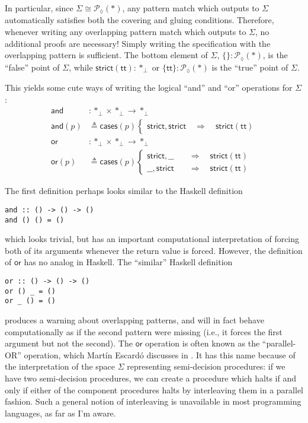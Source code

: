 \documentclass[conference]{IEEEtran}
\newcommand{\PLower}{\mathcal{P}_\lozenge}
\newcommand{\One}{\ast}
\newcommand{\Branch}{\Rightarrow}
\begin{document}
In particular, since $\Sigma \cong \PLower(\One)$, any pattern match which outputs to $\Sigma$ automatically satisfies both the covering and gluing conditions. Therefore, whenever writing any overlapping pattern match which outputs to $\Sigma$, no additional proofs are necessary! Simply writing the specification with the overlapping pattern is sufficient. The bottom element of $\Sigma$, $\{ \} : \PLower(\One)$, is the ``false'' point of $\Sigma$, while $\mathsf{strict}(\mathsf{tt}) : \One_\bot$ or $\{ \mathsf{tt} \} : \PLower(\One)$ is the ``true'' point of $\Sigma$.

This yields some cute ways of writing the logical ``and'' and ``or'' operations for $\Sigma$:
\begin{align*}
\mathsf{and} &: \One_\bot \times \One_\bot \to \One_\bot
\\ \mathsf{and}(p) &\triangleq \mathsf{cases}(p)
\begin{cases}
\mathsf{strict} , \mathsf{strict}
  \quad \Branch \quad \mathsf{strict}(\mathsf{tt})
\end{cases}
\\
\mathsf{or} &: \One_\bot \times \One_\bot \to \One_\bot
\\ \mathsf{or}(p) &\triangleq \mathsf{cases}(p)
\begin{cases}
\mathsf{strict} , \_\_
  \quad &\Branch \quad \mathsf{strict}(\mathsf{tt})
\\  \_\_ , \mathsf{strict}
  \quad &\Branch \quad \mathsf{strict}(\mathsf{tt})
\end{cases}
\end{align*}

The first definition perhaps looks similar to the Haskell definition
\begin{verbatim}
and :: () -> () -> ()
and () () = ()
\end{verbatim}
which looks trivial, but has an important computational interpretation of forcing both of its arguments whenever the return value is forced. However, the definition of $\mathsf{or}$ has no analog in Haskell. The ``similar'' Haskell definition
\begin{verbatim}
or :: () -> () -> ()
or () _ = ()
or _ () = ()
\end{verbatim}
produces a warning about overlapping patterns, and will in fact behave computationally as if the second pattern were missing (i.e., it forces the first argument but not the second). The $\mathsf{or}$ operation is often known as the ``parallel-OR'' operation, which Mart\'in Escard\'o discusses in \cite{escardo2004}. It has this name because of the interpretation of the space $\Sigma$ representing semi-decision procedures: if we have two semi-decision procedures, we can create a procedure which halts if and only if either of the component procedures halts by interleaving them in a parallel fashion. Such a general notion of interleaving is unavailable in most programming languages, as far as I'm aware.
\end{document}
